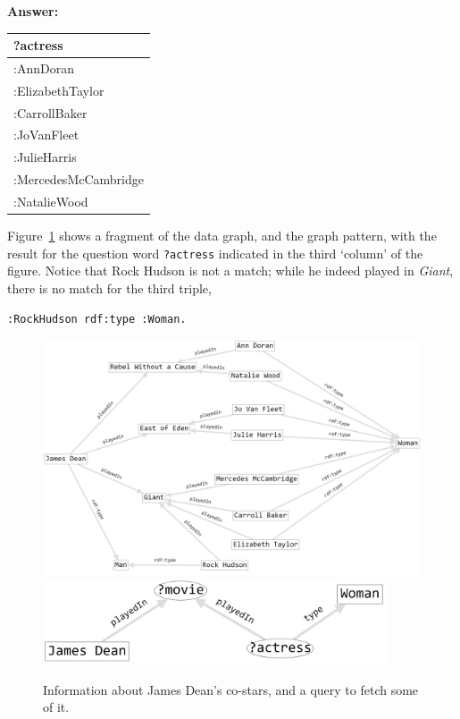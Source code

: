 \textbf{\textbf{Answer:}}

\begin{tabular}{|l|}
\hline
?actress\\
\hline
:AnnDoran\\
:ElizabethTaylor\\
:CarrollBaker\\
:JoVanFleet\\
:JulieHarris\\
:MercedesMcCambridge\\
:NatalieWood\\
\hline
\end{tabular}

Figure~\ref{fig:ch6.4} shows a fragment of the data graph, and the graph pattern,
with the result for the question word \texttt{?actress} indicated in the third
`column' of the figure. Notice that Rock Hudson is not a match; while he
indeed played in \emph{Giant}, there is no match for the third triple,

\begin{lstlisting}
:RockHudson rdf:type :Woman.
\end{lstlisting}

\begin{figure}
\centering
\includegraphics[width=5in]{SWWOv3/media/ch6/figure6-4a.png}
\includegraphics[width=4in]{SWWOv3/media/ch6/figure6-4b.png}
\caption{Information about James Dean's co-stars, and a query to fetch some of it.}
\label{fig:ch6.4}
\end{figure}


